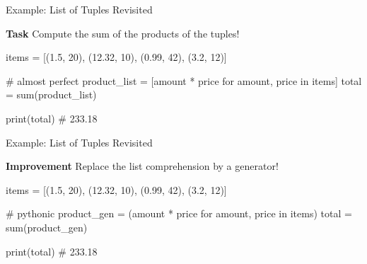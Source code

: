 \begin{frame}[fragile]{Example: List of Tuples Revisited}

    \begin{block}{{\bf Task}}
        Compute the sum of the products of the tuples!
    \end{block}

    \vspace{1em}

    \begin{pythoncode}
items = [(1.5, 20), (12.32, 10), (0.99, 42), (3.2, 12)]

# almost perfect
product_list = [amount * price for amount, price in items]
total = sum(product_list)

print(total)    # 233.18
    \end{pythoncode}

\end{frame}

\begin{frame}[fragile]{Example: List of Tuples Revisited}

    \begin{alertblock}{{\bf Improvement}}
        Replace the list comprehension by a generator!
    \end{alertblock}

    \vspace{1em}

    \begin{pythoncode}
items = [(1.5, 20), (12.32, 10), (0.99, 42), (3.2, 12)]

# pythonic
product_gen = (amount * price for amount, price in items)
total = sum(product_gen)

print(total)    # 233.18
    \end{pythoncode}

\end{frame}

